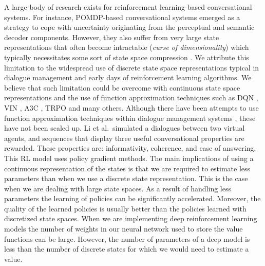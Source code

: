 A large body of research exists for reinforcement learning-based conversational systems. For instance, POMDP-based conversational systems  emerged as a strategy to cope with uncertainty originating from the perceptual and semantic decoder components. However, they also suffer from very large state representations that often become intractable (\textit{curse of dimensionality}) which typically necessitates some sort of state space compression . We attribute this limitation to the widespread use of discrete state space representations typical in dialogue management and early days of reinforcement learning algorithms. We believe that such limitation could be overcome with continuous state space representations and the use of function approximation techniques such as DQN , VIN , A3C , TRPO  and many others. Although there have been attempts to use function approximation techniques within dialogue management systems , these have not been scaled up. Li et al.\  simulated a dialogues between two virtual agents, and sequences that display three useful conversational properties are rewarded. These properties are: informativity, coherence, and ease of answering. This RL model uses policy gradient methods.
The main implications of using a continuous representation of the states is that we are required to estimate less parameters than when we use a discrete state representation. This is the case when we are dealing with large state spaces. As a result of handling less parameters the learning of policies can be significantly accelerated. Moreover, the quality of the learned policies is usually better than the policies learned with discretized state spaces. When we are implementing deep reinforcement learning models the number of weights in our neural network used to store the value functions can be large. However, the number of parameters of a deep model is less than the number of discrete states for which we would need to estimate a value.
